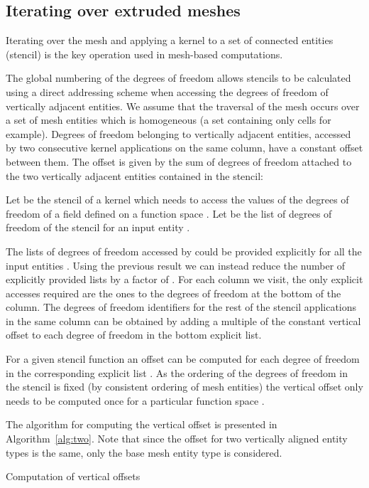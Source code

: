 \documentclass[11pt, a4paper]{scrartcl}
\begin{document}
\subsection{Iterating over extruded meshes}
\label{ssec:ext-mesh-iteration}

Iterating over the mesh and applying a kernel to a set of connected
entities (stencil) is the key operation used in mesh-based
computations.

The global numbering of the degrees of freedom allows stencils to be
calculated using a direct addressing scheme when accessing the degrees
of freedom of vertically adjacent entities. We assume that the
traversal of the mesh occurs over a set of mesh entities which is
homogeneous (a set containing only cells for example). Degrees of
freedom belonging to vertically adjacent entities, accessed by two
consecutive kernel applications on the same column, have a constant
offset between them. The offset is given by the sum of degrees of
freedom attached to the two vertically adjacent entities contained in
the stencil:


Let  be the stencil of a kernel which needs to access the values of
the degrees of freedom of a field  defined on a function space
. Let
 be the list of degrees of freedom of the stencil
for an input entity .

The lists of degrees of freedom accessed by  could be provided
explicitly for all the input entities . Using the previous result
we can instead reduce the number of explicitly provided lists by a
factor of . For each column we visit, the only explicit
accesses required are the ones to the degrees of freedom at the bottom
of the column. The degrees of freedom identifiers for the rest of the
stencil applications in the same column can be obtained by adding a
multiple of the constant vertical offset to each degree of freedom in
the bottom explicit list.

For a given stencil function  an offset can be computed for each
degree of freedom in the corresponding explicit list
. As the ordering of the degrees of freedom in the
stencil is fixed (by consistent ordering of mesh entities) the
vertical offset only needs to be computed once for a particular
function space .

The algorithm for computing the vertical offset is presented in
Algorithm~\ref{alg:two}. Note that since the offset for two vertically
aligned entity types is the same, only the base mesh entity type is
considered.
\begin{algorithm}[th]
\caption{Computation of vertical offsets}
\label{alg:two}
\begin{algorithmic}

	\STATE 
	\STATE 
\ENDFOR
\end{algorithmic}
\end{algorithm}
\end{document}
